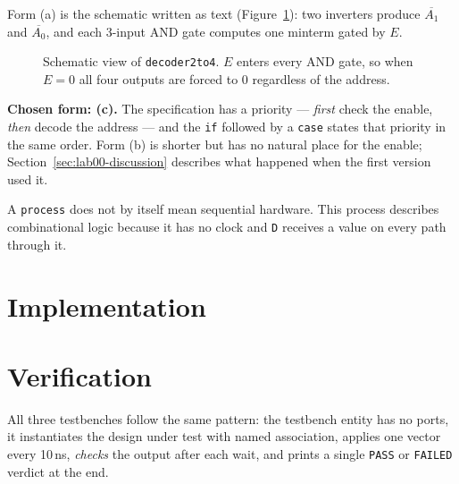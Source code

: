 Form (a) is the schematic written as text (Figure~\ref{fig:lab00-dec-sch}): two
inverters produce $\overline{A_1}$ and $\overline{A_0}$, and each 3-input AND gate
computes one minterm gated by $E$.

\begin{figure}[htbp]
\centering

\caption{Schematic view of \texttt{decoder2to4}. $E$ enters every AND gate, so when
$E = 0$ all four outputs are forced to 0 regardless of the address.}
\label{fig:lab00-dec-sch}
\end{figure}

\textbf{Chosen form: (c).} The specification has a priority --- \emph{first} check
the enable, \emph{then} decode the address --- and the \texttt{if} followed by a
\texttt{case} states that priority in the same order. Form (b) is shorter but has no
natural place for the enable; Section~\ref{sec:lab00-discussion} describes what
happened when the first version used it.

A \texttt{process} does not by itself mean sequential hardware. This process
describes combinational logic because it has no clock and \texttt{D} receives a
value on every path through it.

\section{Implementation}




\section{Verification}

All three testbenches follow the same pattern: the testbench entity has no ports,
it instantiates the design under test with named association, applies one vector
every 10\,ns, \emph{checks} the output after each wait, and prints a single
\texttt{PASS} or \texttt{FAILED} verdict at the end.

